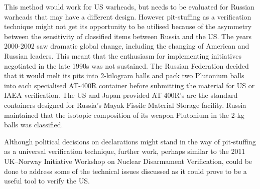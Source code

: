 \documentclass[twoside,titlepage,11pt,twocolumn,a4paper]{article}
\begin{document}
This method would work for US warheads, but needs
to be evaluated for Russian warheads that may have a different
design. \citep{zarimpas2003} However pit-stuffing as a verification
technique might not get its opportunity to be utilised because of the
asymmetry between the sensitivity of classified items between Russia
and the US. The years 2000-2002 saw dramatic global change, including
the changing of American and Russian leaders. This meant that the
enthusiasm for implementing initiatives negotiated in the late 1990s
was not sustained. The Russian Federation decided that it would melt
its pits into 2-kilogram balls and pack two Plutonium balls into each
specialised AT-400R container before submitting the material for
US or IAEA verification. The US and Japan provided AT-400R's are the
standard containers designed for Russia's Mayak Fissile Material
Storage facility. Russia maintained that the isotopic composition of
its weapon Plutonium in the 2-kg balls was
classified. \citep{IPFN2008}

Although political decisions on declarations might stand in the way of
pit-stuffing as a universal verification technique, further work,
perhaps similar to the 2011 UK--Norway Initiative Workshop on Nuclear
Disarmament Verification, could be done to address some of the
technical issues discussed as it could prove to be a useful tool to
verify the US.
\end{document}
